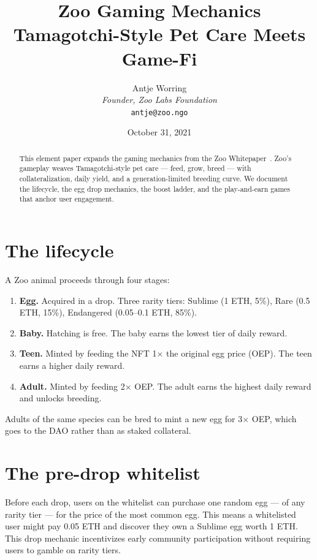 \documentclass[11pt,letterpaper]{article}
\title{\textbf{Zoo Gaming Mechanics}\\\large Tamagotchi-Style Pet Care Meets Game-Fi}
\author{Antje Worring \\ \textit{Founder, Zoo Labs Foundation} \\ \texttt{antje@zoo.ngo}}
\date{October 31, 2021}
\begin{document}
\maketitle

\begin{abstract}
This element paper expands the gaming mechanics from the Zoo Whitepaper~\cite{zoo2021}. Zoo's gameplay weaves Tamagotchi-style pet care --- feed, grow, breed --- with collateralization, daily yield, and a generation-limited breeding curve. We document the lifecycle, the egg drop mechanics, the boost ladder, and the play-and-earn games that anchor user engagement.
\end{abstract}

\section{The lifecycle}

A Zoo animal proceeds through four stages:

\begin{enumerate}
  \item \textbf{Egg.} Acquired in a drop. Three rarity tiers: Sublime (1 ETH, 5\%), Rare (0.5 ETH, 15\%), Endangered (0.05--0.1 ETH, 85\%).
  \item \textbf{Baby.} Hatching is free. The baby earns the lowest tier of daily reward.
  \item \textbf{Teen.} Minted by feeding the NFT 1$\times$ the original egg price (OEP). The teen earns a higher daily reward.
  \item \textbf{Adult.} Minted by feeding 2$\times$ OEP. The adult earns the highest daily reward and unlocks breeding.
\end{enumerate}

Adults of the same species can be bred to mint a new egg for 3$\times$ OEP, which goes to the DAO rather than as staked collateral.

\section{The pre-drop whitelist}

Before each drop, users on the whitelist can purchase one random egg --- of any rarity tier --- for the price of the most common egg. This means a whitelisted user might pay 0.05 ETH and discover they own a Sublime egg worth 1 ETH. This drop mechanic incentivizes early community participation without requiring users to gamble on rarity tiers.
\end{document}
